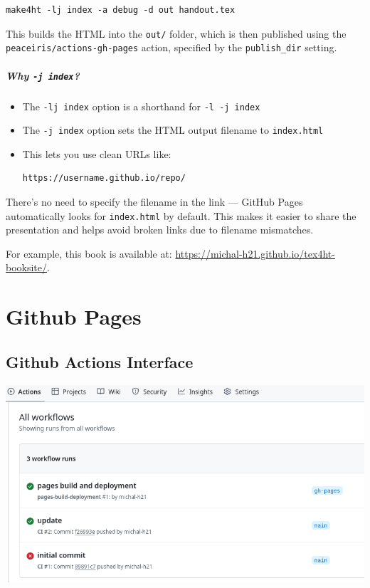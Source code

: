 \documentclass{book}
\begin{document}
\begin{verbatim}
make4ht -lj index -a debug -d out handout.tex
\end{verbatim}


This builds the HTML into the \texttt{out/} folder, which is then published
using the \texttt{peaceiris/actions-gh-pages} action, specified by the
\texttt{publish\_dir} setting.


\paragraph{Why \texttt{-j index}?}
\begin{itemize}
  \item The \texttt{-lj index} option is a shorthand for \texttt{-l -j index}
  \item The \texttt{-j index} option sets the HTML output filename to \texttt{index.html}
  \item This lets you use clean URLs like:
  
\begin{verbatim}
https://username.github.io/repo/
\end{verbatim}

\end{itemize}


There’s no need to specify the filename in the link — GitHub Pages
automatically looks for \texttt{index.html} by default. This makes it easier to share
the presentation and helps avoid broken links due to filename mismatches.

For example, this book is available at: \url{https://michal-h21.github.io/tex4ht-booksite/}.

\chapter{Github Pages}

\section{Github Actions Interface}
\includegraphics[width=\textwidth]{img/github-actions.png}
\end{document}
